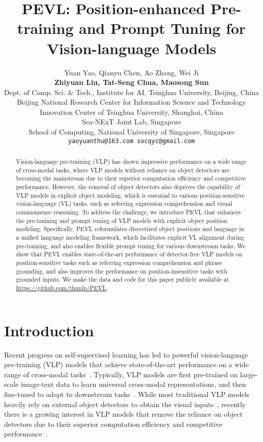 \documentclass[11pt]{article}
\title{PEVL: Position-enhanced Pre-training and Prompt Tuning for Vision-language Models}
\author{Yuan Yao\hspace{0.36em}, Qianyu Chen,  Ao Zhang, Wei Ji\\ \textbf{Zhiyuan Liu, Tat-Seng Chua, Maosong Sun}\\
Dept. of Comp. Sci. \& Tech., Institute for AI, Tsinghua University, Beijing, China\\
Beijing National Research Center for Information Science and Technology\\
Innovation Center of Tsinghua University, Shanghai, China\\
Sea-NExT Joint Lab, Singapore\\
School of Computing, National University of Singapore, Singapore\\
\texttt{yaoyuanthu@163.com \hspace{1em} socqyc@gmail.com}
}
\begin{document}
\maketitle
\begin{abstract}
Vision-language pre-training (VLP) has shown impressive performance on a wide range of cross-modal tasks, where VLP models without reliance on object detectors are becoming the mainstream due to their superior computation efficiency and competitive performance. However, the removal of object detectors also deprives the capability of VLP models in explicit object modeling, which is essential to various position-sensitive vision-language (VL) tasks, such as referring expression comprehension and visual commonsense reasoning. To address the challenge, we introduce PEVL that enhances the pre-training and prompt tuning of VLP models with explicit object position modeling. Specifically, PEVL reformulates discretized object positions and language in a unified language modeling framework, which facilitates explicit VL alignment during pre-training, and also enables flexible prompt tuning for various downstream tasks. We show that PEVL enables state-of-the-art performance of detector-free VLP models on position-sensitive tasks such as referring expression comprehension and phrase grounding, and also improves the performance on position-insensitive tasks with grounded inputs. We make the data and code for this paper publicly available at \url{https://github.com/thunlp/PEVL}.
\end{abstract}

{\let\thefootnote\relax{}}

\section{Introduction}
Recent progress on self-supervised learning has led to powerful vision-language pre-training (VLP) models that achieve state-of-the-art performance on a wide range of cross-modal tasks~\cite{lu2019vilbert,li2020oscar,radford2021learning,zhang2021vinvl,kamath2021mdetr}. Typically, VLP models are first pre-trained on large-scale image-text data to learn universal cross-modal representations, and then fine-tuned to adapt to downstream tasks~\cite{bommasani2021opportunities}. While most traditional VLP models heavily rely on external object detectors to obtain the visual inputs~\cite{lu2019vilbert,su2019vl,li2020oscar,zhang2021vinvl}, recently there is a growing interest in VLP models that remove the reliance on object detectors due to their superior computation efficiency and competitive performance~\cite{li2021align,kim2021vilt,radford2021learning,kamath2021mdetr}.
\end{document}

